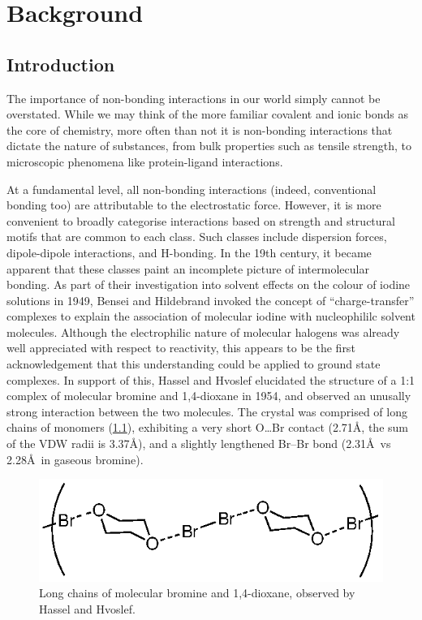 \part{Background}
\begin{refsection}

\chapter{Introduction}

The importance of non-bonding interactions in our world simply cannot be overstated.
While we may think of the more familiar covalent and ionic bonds as the core of chemistry, more often than not it is non-bonding interactions that dictate the nature of substances, from bulk properties such as tensile strength, to microscopic phenomena like protein-ligand interactions.

At a fundamental level, all non-bonding interactions (indeed, conventional bonding too) are attributable to the electrostatic force.
However, it is more convenient to broadly categorise interactions based on strength and structural motifs that are common to each class.
Such classes include dispersion forces, dipole-dipole interactions, and H-bonding.
In the 19th century, it became apparent that these classes paint an incomplete picture of intermolecular bonding.
As part of their investigation into solvent effects on the colour of iodine solutions in 1949, Bensei and Hildebrand invoked the concept of ``charge-transfer'' complexes to explain the association of molecular iodine with nucleophililc solvent molecules.\autocite{Benesi1949}
Although the electrophilic nature of molecular halogens was already well appreciated with respect to reactivity, this appears to be the first acknowledgement that this understanding could be applied to ground state complexes.
In support of this, Hassel and Hvoslef elucidated the structure of a 1:1 complex of molecular bromine and 1,4-dioxane in 1954, and observed an unusally strong interaction between the two molecules.\autocite{Hassel1954}
The crystal was comprised of long chains of monomers (\cref{fig:hassel-xray}), exhibiting a very short O\dots Br contact (2.71\AA, the sum of the VDW radii is 3.37\AA), and a slightly lengthened Br--Br bond (2.31\AA~vs 2.28\AA~in gaseous bromine).

\begin{figure}[ht]
  \includegraphics[width=0.6\columnwidth]{Figures/hassel-xray.eps}
  \caption{Long chains of molecular bromine and 1,4-dioxane, observed by Hassel and Hvoslef.}
  \label{fig:hassel-xray}
\end{figure}


\end{refsection}

